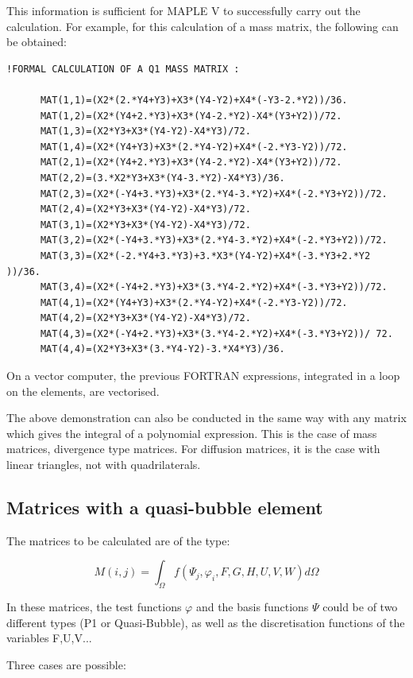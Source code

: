 This information is sufficient for MAPLE V to successfully carry out the
calculation. For example, for this calculation of a mass matrix, the following
can be obtained:
\begin{lstlisting}[language=TelFortran]
!FORMAL CALCULATION OF A Q1 MASS MATRIX :

      MAT(1,1)=(X2*(2.*Y4+Y3)+X3*(Y4-Y2)+X4*(-Y3-2.*Y2))/36.
      MAT(1,2)=(X2*(Y4+2.*Y3)+X3*(Y4-2.*Y2)-X4*(Y3+Y2))/72.
      MAT(1,3)=(X2*Y3+X3*(Y4-Y2)-X4*Y3)/72.
      MAT(1,4)=(X2*(Y4+Y3)+X3*(2.*Y4-Y2)+X4*(-2.*Y3-Y2))/72.
      MAT(2,1)=(X2*(Y4+2.*Y3)+X3*(Y4-2.*Y2)-X4*(Y3+Y2))/72.
      MAT(2,2)=(3.*X2*Y3+X3*(Y4-3.*Y2)-X4*Y3)/36.
      MAT(2,3)=(X2*(-Y4+3.*Y3)+X3*(2.*Y4-3.*Y2)+X4*(-2.*Y3+Y2))/72.
      MAT(2,4)=(X2*Y3+X3*(Y4-Y2)-X4*Y3)/72.
      MAT(3,1)=(X2*Y3+X3*(Y4-Y2)-X4*Y3)/72.
      MAT(3,2)=(X2*(-Y4+3.*Y3)+X3*(2.*Y4-3.*Y2)+X4*(-2.*Y3+Y2))/72.
      MAT(3,3)=(X2*(-2.*Y4+3.*Y3)+3.*X3*(Y4-Y2)+X4*(-3.*Y3+2.*Y2 ))/36.
      MAT(3,4)=(X2*(-Y4+2.*Y3)+X3*(3.*Y4-2.*Y2)+X4*(-3.*Y3+Y2))/72.
      MAT(4,1)=(X2*(Y4+Y3)+X3*(2.*Y4-Y2)+X4*(-2.*Y3-Y2))/72.
      MAT(4,2)=(X2*Y3+X3*(Y4-Y2)-X4*Y3)/72.
      MAT(4,3)=(X2*(-Y4+2.*Y3)+X3*(3.*Y4-2.*Y2)+X4*(-3.*Y3+Y2))/ 72.
      MAT(4,4)=(X2*Y3+X3*(3.*Y4-Y2)-3.*X4*Y3)/36.
\end{lstlisting}
On a vector computer, the previous FORTRAN expressions, integrated in a loop on
the elements, are vectorised.

The above demonstration can also be conducted in the same way with any matrix
which gives the integral of a polynomial expression. This is the case of mass
matrices, divergence type matrices. For diffusion matrices, it is the case with
linear triangles, not with quadrilaterals.

\subsection{Matrices with a quasi-bubble element}

The matrices to be calculated are of the type:


\[M(i,j)=\int _{\Omega }f(\Psi _{j} ,\varphi _{i} ,F,G,H,U,V,W)d\Omega  \]

In these matrices, the test functions $\varphi$ and the basis functions $\Psi$
could be of two different types (P1 or Quasi-Bubble), as well as the
discretisation functions of the variables F,U,V...

Three cases are possible:


